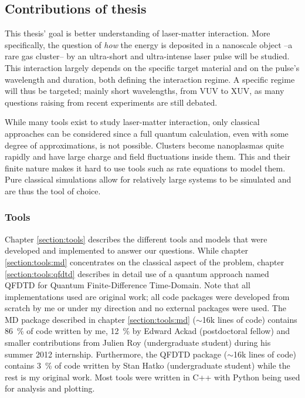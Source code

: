 \clearpage
\subsection{Contributions of thesis}

This thesis' goal is better understanding of
laser-matter interaction.
More specifically, the
question of \textit{how} the energy is deposited in a nanoscale object
--a rare gas cluster-- by an
ultra-short and ultra-intense laser pulse will be studied. This interaction
largely depends on the specific target material and on the pulse's wavelength
and duration, both defining the interaction regime. A specific regime will
thus be targeted; mainly short wavelengths, from VUV to XUV, as many questions
raising from recent experiments are still debated.

While many tools exist to study laser-matter interaction, only classical
approaches can be considered since a full quantum calculation, even
with some degree of approximations, is not possible. Clusters become
nanoplasmas quite rapidly and have large charge and field fluctuations inside
them. This and their finite nature makes it hard to use tools such as rate
equations to model them. Pure classical simulations allow for relatively large
systems to be simulated and are thus the tool of choice.


\subsubsection{Tools}

Chapter \ref{section:tools} describes the different tools and models
that were developed and implemented to answer our questions. While chapter
\ref{section:tools:md} concentrates on the classical aspect of the problem,
chapter \ref{section:tools:qfdtd} describes in detail use of a quantum approach
named QFDTD for Quantum Finite-Difference Time-Domain.
Note that all implementations used are original work; all code packages
were developed from scratch by me or under my direction and no external packages
were used. The MD package described in
chapter \ref{section:tools:md} ($\sim$16k lines of code) contains 86~\% of code
written by me, 12~\% by Edward Ackad (postdoctoral fellow) and smaller contributions from
Julien Roy (undergraduate student) during his summer 2012 internship. Furthermore, the QFDTD package
($\sim$16k lines of code) contains 3~\% of code written by Stan Hatko (undergraduate student) while the
rest is my original work. Most tools were written in C++ with Python being used
for analysis and plotting.

